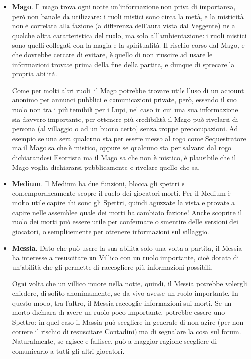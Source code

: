 \documentclass[a4paper,10pt]{article}
\begin{document}
\begin{itemize}
	\item {\bf Mago}. Il mago trova ogni notte un'informazione non priva di importanza, però non banale da utilizzare: i ruoli mistici sono circa la metà, e la misticità non è correlata alla fazione (a differenza dell'aura vista dal Veggente) né a qualche altra caratteristica del ruolo, ma solo all'ambientazione: i ruoli mistici sono quelli collegati con la magia e la spiritualità. Il rischio corso dal Mago, e che dovrebbe cercare di evitare, è quello di non riuscire ad usare le informazioni trovate prima della fine della partita, e dunque di sprecare la propria abilità.
	
	Come per molti altri ruoli, il Mago potrebbe trovare utile l'uso di un account anonimo per annunci pubblici e comunicazioni private, però, essendo il suo ruolo non tra i più temibili per i Lupi, nel caso in cui una sua informazione sia davvero importante, per ottenere più credibilità il Mago può rivelarsi di persona (al villaggio o ad un buono certo) senza troppe preoccupazioni. Ad esempio se una sera qualcuno sta per essere messo al rogo come Sequestratore ma il Mago sa che è mistico, oppure se qualcuno sta per salvarsi dal rogo dichiarandosi Esorcista ma il Mago sa che non è mistico, è plausibile che il Mago voglia dichiararsi pubblicamente e rivelare quello che sa.

	\item {\bf Medium}. Il Medium ha due funzioni, blocca gli spettri e contemporaneamente scopre il ruolo dei giocatori morti. Per il Medium è molto utile capire chi sono gli Spettri, quindi aguzzate la vista e provate a capire nelle assemblee quale dei morti ha cambiato fazione! Anche scoprire il ruolo dei morti può essere utile per confermare o smentire delle versioni dei giocatori, o semplicemente per ottenere informazioni sul villaggio.

	\item {\bf Messia}. Dato che può usare la sua abilità solo una volta a partita, il Messia ha interesse a resuscitare un Villico con un ruolo importante, cioè dotato di un’abilità che gli permette di raccogliere più informazioni possibili. 
	
	Ogni volta che un villico muore nella notte, quindi, il Messia potrebbe volergli chiedere, di solito anonimamente, se da vivo avesse un ruolo importante. In questo modo, tra l’altro, il Messia raccoglie informazioni sui morti. Se un morto dichiara di avere un ruolo poco importante, potrebbe essere uno Spettro: in quel caso il Messia può scegliere in generale di non agire (per non correre il rischio di resuscitare Contadini) ma di segnalare la cosa sul forum. Naturalmente, se agisce e fallisce, può a maggior ragione scegliere di comunicarlo a tutti gli altri giocatori.
	

\end{itemize}
\end{document}
